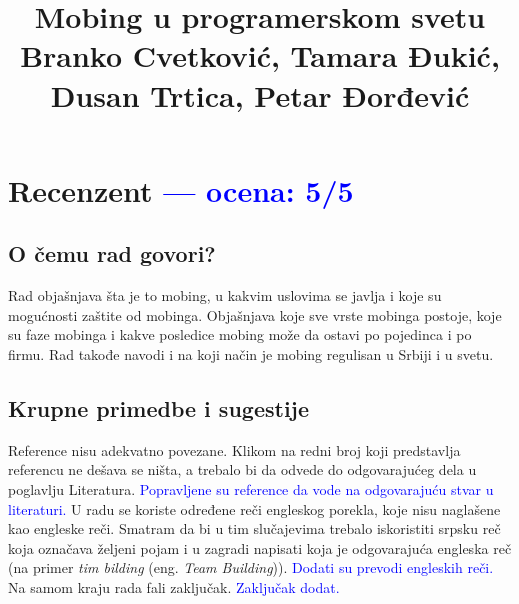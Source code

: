\documentclass[a4paper]{report}
\newcommand{\odgovor}[1]{\textcolor{blue}{#1}}
\begin{document}
\title{Mobing u programerskom svetu\\ \small{Branko Cvetković, Tamara Đukić, Dusan Trtica, Petar Đorđević}}

\maketitle

\tableofcontents

\chapter{Recenzent \odgovor{--- ocena: 5/5} }

\section{O čemu rad govori?}
Rad objašnjava šta je to mobing, u kakvim uslovima se javlja i koje su mogućnosti zaštite od mobinga. Objašnjava koje sve vrste mobinga postoje, koje su faze mobinga i kakve posledice mobing može da ostavi po pojedinca i po firmu. Rad takođe navodi i na koji način je mobing regulisan u Srbiji i u svetu.

\section{Krupne primedbe i sugestije}
Reference nisu adekvatno povezane. Klikom na redni broj koji predstavlja referencu ne dešava se ništa, a trebalo bi da odvede do odgovarajućeg dela u poglavlju Literatura. \odgovor{Popravljene su reference da vode na odgovarajuću stvar u literaturi.} U radu se koriste određene reči engleskog porekla, koje nisu naglašene kao engleske reči. Smatram da bi u tim slučajevima trebalo iskoristiti srpsku reč koja označava željeni pojam i u zagradi napisati koja je odgovarajuća engleska reč (na primer \textit{tim bilding} (eng. \textit{Team Building})). \odgovor{Dodati su prevodi engleskih reči.} Na samom kraju rada fali zaključak. \odgovor{Zaključak dodat.}
\end{document}
